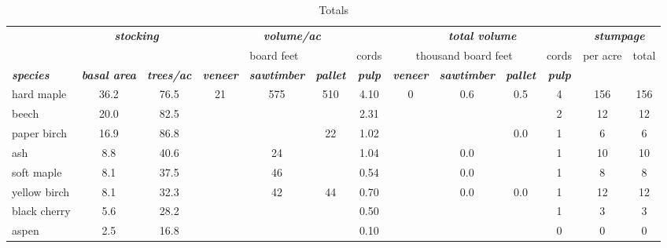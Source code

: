 \documentclass[landscape]{article}
\begin{document}
\begin{table}[H]

\caption{\label{tab:unnamed-chunk-58}Totals}
\fontsize{10}{12}\selectfont
\begin{tabular}[t]{lcccccccccccc}
\toprule
\multicolumn{1}{c}{\em{\textbf{ }}} & \multicolumn{2}{c}{\em{\textbf{stocking}}} & \multicolumn{4}{c}{\em{\textbf{volume/ac }}} & \multicolumn{4}{c}{\em{\textbf{total volume}}} & \multicolumn{2}{c}{\em{\textbf{stumpage}}} \\
\cmidrule(l{3pt}r{3pt}){2-3} \cmidrule(l{3pt}r{3pt}){4-7} \cmidrule(l{3pt}r{3pt}){8-11} \cmidrule(l{3pt}r{3pt}){12-13}
\multicolumn{3}{c}{ } & \multicolumn{3}{c}{board feet} & \multicolumn{1}{c}{cords} & \multicolumn{3}{c}{thousand board feet} & \multicolumn{1}{c}{cords} & \multicolumn{1}{c}{per acre} & \multicolumn{1}{c}{total} \\
\cmidrule(l{3pt}r{3pt}){4-6} \cmidrule(l{3pt}r{3pt}){7-7} \cmidrule(l{3pt}r{3pt}){8-10} \cmidrule(l{3pt}r{3pt}){11-11} \cmidrule(l{3pt}r{3pt}){12-12} \cmidrule(l{3pt}r{3pt}){13-13}
\rowcolor[HTML]{DCDCDC}  \em{\textbf{species}} & \em{\textbf{basal area}} & \em{\textbf{trees/ac}} & \em{\textbf{veneer}} & \em{\textbf{sawtimber}} & \em{\textbf{pallet}} & \em{\textbf{pulp}} & \em{\textbf{veneer}} & \em{\textbf{sawtimber}} & \em{\textbf{pallet}} & \em{\textbf{pulp}} & \em{\textbf{ }} & \em{\textbf{ }}\\
\midrule
\rowcolor{gray!6}  hard maple & 36.2 & 76.5 & 21 & 575 & 510 & 4.10 & 0 & 0.6 & 0.5 & 4 & 156 & 156\\
 
beech & 20.0 & 82.5 &  &  &  & 2.31 &  &  &  & 2 & 12 & 12\\
 
\rowcolor{gray!6}  paper birch & 16.9 & 86.8 &  &  & 22 & 1.02 &  &  & 0.0 & 1 & 6 & 6\\
 
ash & 8.8 & 40.6 &  & 24 &  & 1.04 &  & 0.0 &  & 1 & 10 & 10\\
 
\rowcolor{gray!6}  soft maple & 8.1 & 37.5 &  & 46 &  & 0.54 &  & 0.0 &  & 1 & 8 & 8\\
 
yellow birch & 8.1 & 32.3 &  & 42 & 44 & 0.70 &  & 0.0 & 0.0 & 1 & 12 & 12\\
 
\rowcolor{gray!6}  black cherry & 5.6 & 28.2 &  &  &  & 0.50 &  &  &  & 1 & 3 & 3\\
 
aspen & 2.5 & 16.8 &  &  &  & 0.10 &  &  &  & 0 & 0 & 0\\
 

\end{tabular}
\end{table}
\end{document}
